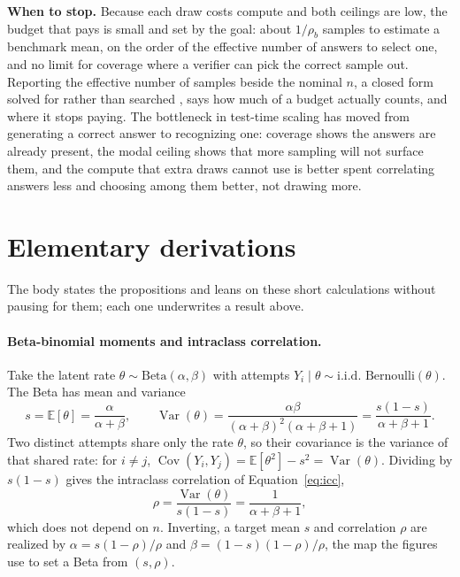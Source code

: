 \documentclass[11pt]{article}
\newcommand{\E}{\mathbb{E}}
\newcommand{\Var}{\operatorname{Var}}
\newcommand{\Cov}{\operatorname{Cov}}
\begin{document}
\textbf{When to stop.} Because each draw costs compute and both ceilings are low, the budget that pays is small and set by the goal: about $1/\rho_b$ samples to estimate a benchmark mean, on the order of the effective number of answers to select one, and no limit for coverage where a verifier can pick the correct sample out. Reporting the effective number of samples beside the nominal $n$, a closed form solved for rather than searched \citep{bay2026kore}, says how much of a budget actually counts, and where it stops paying. The bottleneck in test-time scaling has moved from generating a correct answer to recognizing one: coverage shows the answers are already present, the modal ceiling shows that more sampling will not surface them, and the compute that extra draws cannot use is better spent correlating answers less and choosing among them better, not drawing more.




\clearpage
\appendix
{}

\section{Elementary derivations}
\label{app:derivations}

The body states the propositions and leans on these short calculations without pausing for them; each one underwrites a result above.

\paragraph{Beta-binomial moments and intraclass correlation.}
Take the latent rate $\theta\sim\mathrm{Beta}(\alpha,\beta)$ with attempts $Y_i\mid\theta\sim\text{i.i.d.\ Bernoulli}(\theta)$. The Beta has mean and variance
\[
s = \E[\theta] = \frac{\alpha}{\alpha+\beta}, \qquad
\Var(\theta) = \frac{\alpha\beta}{(\alpha+\beta)^2(\alpha+\beta+1)} = \frac{s(1-s)}{\alpha+\beta+1}.
\]
Two distinct attempts share only the rate $\theta$, so their covariance is the variance of that shared rate: for $i\ne j$, $\Cov(Y_i,Y_j) = \E[\theta^2]-s^2 = \Var(\theta)$. Dividing by $s(1-s)$ gives the intraclass correlation of Equation~\eqref{eq:icc},
\[
\rho = \frac{\Var(\theta)}{s(1-s)} = \frac{1}{\alpha+\beta+1},
\]
which does not depend on $n$. Inverting, a target mean $s$ and correlation $\rho$ are realized by $\alpha = s(1-\rho)/\rho$ and $\beta = (1-s)(1-\rho)/\rho$, the map the figures use to set a Beta from $(s,\rho)$.
\end{document}
